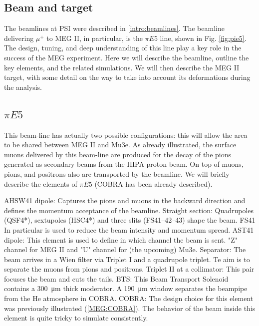 \begin{refsection}
\section{Beam and target}
    The beamlines at PSI were described in \ref{intro:beamlines}. 
    The beamline delivering $\mu^+$ to MEG II, in particular, is the $\pi E5$ line, shown in  Fig. \ref{fig:pie5}.
    The design, tuning, and deep understanding of this line play a key role in the success of the MEG experiment. 
    Here we will describe the beamline, outline the key elements, and the related simulations. 
    We will then describe the MEG II target, with some detail on the way to take into account its deformations during the analysis.

    \subsection{$\pi E5$}
        This beam-line has actually two possible configurations: this will allow the area to be shared between MEG II and Mu3e. 
        As already illustrated, the surface muons delivered by this beam-line are produced for the decay of the pions generated as secondary beams from the HIPA proton beam.
        On top of muons, pions, and positrons also are transported by the beamline.
        We will briefly describe the elements of $\pi E5$ (COBRA has been already described). 

        \begin{outline}
            \1 AHSW41 dipole: Captures the pions and muons in the backward direction and defines the momentum acceptance of the beamline.
            \1 Straight section: Quadrupoles (QSF4*), sextupoles (HSC4*) and three slits (FS41–42–43) shape the beam. FS41 In particular is used to reduce the beam intensity and momentum spread.
            \1 AST41 dipole: This element is used to define in which channel the beam is sent. "Z" channel for MEG II and "U" channel for (the upcoming) Mu3e.
            \1 Separator: The beam arrives in a Wien filter via Triplet I and a quadrupole triplet. Te aim is to separate the muons from pions and positrons.
            \1 Triplet II at a collimator: This pair focuses the beam and cuts the tails.
            \1 BTS: This Beam Transport Solenoid contains a \SI{300}{\micro m} thick \mylar moderator.
            \1 A \SI{190}{\micro m} \mylar window separates the beampipe from the He atmosphere in COBRA.
            \1 COBRA: The design choice for this element was previously illustrated (\ref{MEG:COBRA}). 
            The behavior of the beam inside this element is quite tricky to simulate consistently.
        \end{outline}


\end{refsection}

